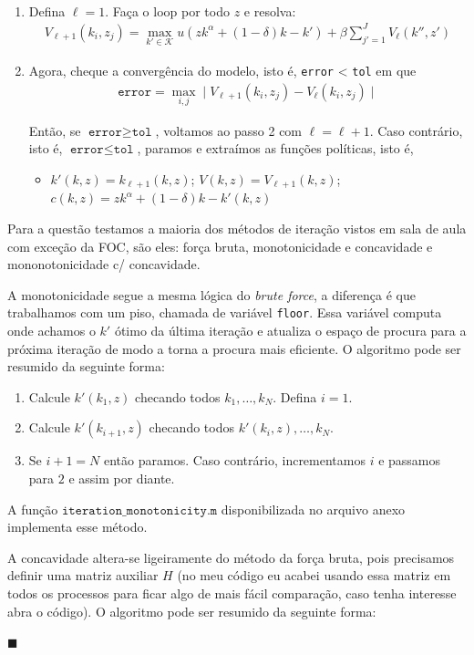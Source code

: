 \documentclass[10pt]{article}
\newcommand*{\QEDA}{\hfill\ensuremath{\blacksquare}}%
\newcommand\0{\mathbf{0}}
\newenvironment{sol}
    {\\[1em] {\color{magenta}\text{Resposta.}}
    }
    {{\color{blue!50!black}\QEDA}}
\begin{document}
\begin{enumerate}[wide]
\begin{sol}
\begin{enumerate}[wide]
\item Defina $\ell = 1$. Faça o loop por todo $z$ e resolva: 
\begin{align*}
V_{\ell + 1}(k_i, z_j) = \max_{k' \in \mathcal{K}} u(zk^\alpha + (1-\delta)k - k') + \beta \sum_{j' = 1 }^J V_\ell (k'', z')
\end{align*}

\item Agora, cheque a convergência do modelo, isto é, \texttt{error} < \texttt{tol} em que
\begin{align*}
\texttt{error} = \max_{i,j} \mid V_{\ell + 1}(k_i, z_j) - V_\ell(k_i, z_j)\mid
\end{align*} 

Então, se $\texttt{error} \geq \texttt{tol}$, voltamos ao passo 2 com $\ell = \ell + 1$. Caso contrário, isto é, $\texttt{error} \leq \texttt{tol}$, paramos e extraímos as funções políticas, isto é,
\begin{itemize}
\item $k'(k,z) = k_{\ell + 1}(k,z)$; $V(k,z) = V_{\ell + 1}(k,z)$; $c(k,z) = zk^\alpha + (1-\delta)k - k'(k,z)$
\end{itemize}

\end{enumerate}
Para a questão testamos a maioria dos métodos de iteração vistos em sala de aula com exceção da FOC, são eles: força bruta, monotonicidade e concavidade e mononotonicidade c/ concavidade. 

A monotonicidade segue a mesma lógica do \textit{brute force}, a diferença é que trabalhamos com um piso, chamada de variável \texttt{floor}. Essa variável computa onde achamos o $k'$ ótimo da última iteração e atualiza o espaço de procura para a próxima iteração de modo a torna a procura mais eficiente. O algoritmo pode ser resumido da seguinte forma:

\begin{enumerate}
\item Calcule $k'(k_1,z)$ checando todos $k_1, \ldots, k_N$. Defina $i = 1$. 
\item Calcule $k'(k_{i+1}, z)$ checando todos $k'(k_i,z), \ldots, k_N$.
\item Se $i +1 = N$ então paramos. Caso contrário, incrementamos $i$ e passamos para $2$ e assim por diante.
\end{enumerate}

A função $\texttt{iteration\_monotonicity.m}$ disponibilizada no arquivo anexo implementa esse método.

A concavidade altera-se ligeiramente do método da força bruta, pois precisamos definir uma matriz auxiliar $H$ (no meu código eu acabei usando essa matriz em todos os processos para ficar algo de mais fácil comparação, caso tenha interesse abra o código). O algoritmo pode ser resumido da seguinte forma:


\end{sol}
\end{enumerate}
\end{document}

